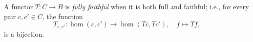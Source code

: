 A functor $T: C \rightarrow B$ is \emph{fully faithful} when it is both full and faithful; i.e., for every pair $c, c' \in C$, the function
$$T_{c, c'}: \hom(c, c') \rightarrow \hom(Tc, Tc'), \quad f \mapsto Tf,$$
is a bijection.
